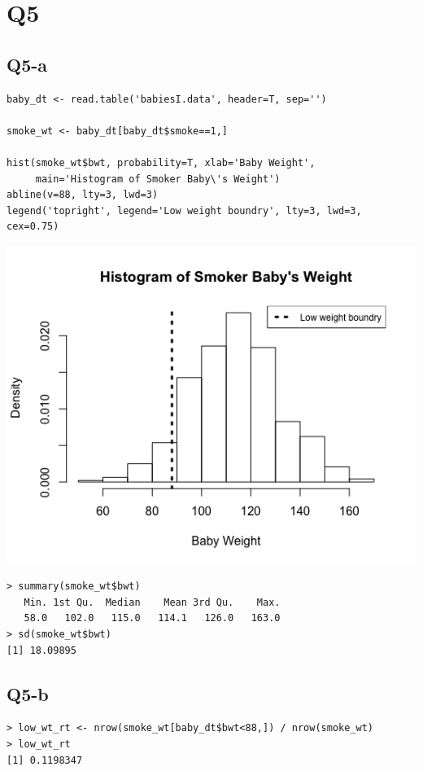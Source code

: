 \documentclass[11pt,letterpaper]{article}
\begin{document}
\section*{Q5}
\subsection*{Q5-a}
\begin{verbatim}
baby_dt <- read.table('babiesI.data', header=T, sep='')

smoke_wt <- baby_dt[baby_dt$smoke==1,]

hist(smoke_wt$bwt, probability=T, xlab='Baby Weight',
     main='Histogram of Smoker Baby\'s Weight')
abline(v=88, lty=3, lwd=3)
legend('topright', legend='Low weight boundry', lty=3, lwd=3, cex=0.75)
\end{verbatim}

\includegraphics[width=150mm]{hist_smoker.png}

\begin{verbatim}
> summary(smoke_wt$bwt)
   Min. 1st Qu.  Median    Mean 3rd Qu.    Max. 
   58.0   102.0   115.0   114.1   126.0   163.0 
> sd(smoke_wt$bwt)
[1] 18.09895
\end{verbatim}

\newpage
\subsection*{Q5-b}
\begin{verbatim}
> low_wt_rt <- nrow(smoke_wt[baby_dt$bwt<88,]) / nrow(smoke_wt)
> low_wt_rt
[1] 0.1198347
\end{verbatim}
\end{document}
